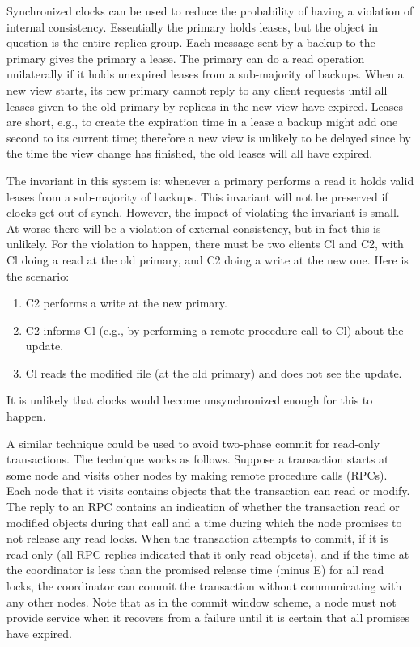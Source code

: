 \documentclass[a4paper,11pt,notitlepage,twoside,openright]{article}
\begin{document}
Synchronized clocks can be used to reduce the probability of having a
violation of internal consistency. Essentially the primary holds leases,
but the object in question is the entire replica group. Each message
sent by a backup to the primary gives the primary a lease. The primary
can do a read operation unilaterally if it holds unexpired leases from a
sub-majority of backups. When a new view starts, its new primary cannot
reply to any client requests until all leases given to the old primary
by replicas in the new view have expired. Leases are short, e.g., to
create the expiration time in a lease a backup might add one second to
its current time; therefore a new view is unlikely to be delayed since
by the time the view change has finished, the old leases will all have
expired.

The invariant in this system is: whenever a primary performs a read it
holds valid leases from a sub-majority of backups. This invariant will
not be preserved if clocks get out of synch. However, the impact of
violating the invariant is small. At worse there will be a violation of
external consistency, but in fact this is unlikely. For the violation to
happen, there must be two clients Cl and C2, with Cl doing a read at the
old primary, and C2 doing a write at the new one. Here is the scenario:


\begin{enumerate}
\def\labelenumi{\arabic{enumi}.}
\item

  C2 performs a write at the new primary.

\item

  C2 informs Cl (e.g., by performing a remote procedure call to Cl)
  about the update.

\item

  Cl reads the modified file (at the old primary) and does not see the
  update.

\end{enumerate}


It is unlikely that clocks would become unsynchronized enough for this
to happen.

A similar technique could be used to avoid two-phase commit for
read-only transactions.
The technique works as follows. Suppose a transaction starts at some
node and visits other nodes by making remote procedure calls (RPCs).
Each node that it visits contains objects that the transaction can read
or modify. The reply to an RPC contains an indication of whether the
transaction read or modified objects during that call and a time during
which the node promises to not release any read locks. When the
transaction attempts to commit, if it is read-only (all RPC replies
indicated that it only read objects), and if the time at the coordinator
is less than the promised release time (minus E) for all read locks, the
coordinator can commit the transaction without communicating with any
other nodes. Note that as in the commit window scheme, a node must not
provide service when it recovers from a failure until it is certain that
all promises have expired.
\end{document}
